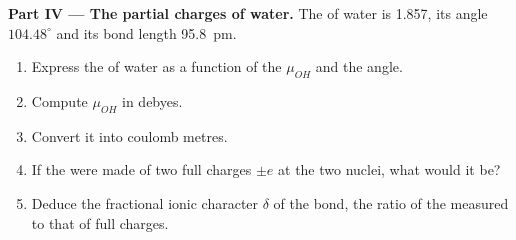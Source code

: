 \begin{problem}
\medskip
\noindent\textbf{Part IV --- The partial charges of water.}
The  of water is \qty{1.857}{\debye}, its angle
$104.48^\circ$ and its  bond length \qty{95.8}{pm}.
\begin{enumerate}[resume]
  \item Express the  of water as a function of the  $\mu_{OH}$ and the angle.
  \item Compute $\mu_{OH}$ in debyes.
  \item Convert it into coulomb metres.
  \item If the  were made of two full charges $\pm e$ at the
        two nuclei, what would it be?
  \item Deduce the fractional ionic character $\delta$ of the 
        bond, the ratio of the measured  to that of full
        charges.
\end{enumerate}
\end{problem}
